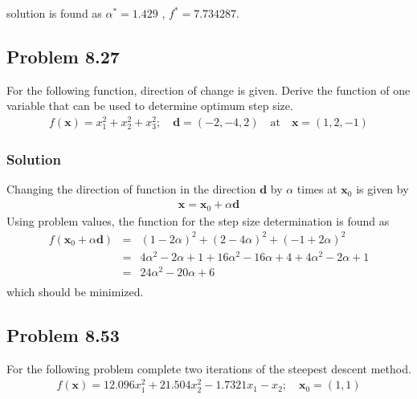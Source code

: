 \documentclass[]{report}
\begin{document}
solution is found as $\alpha^*=1.429$ , $  f^*=7.734287$.
\subsection*{Problem 8.27}
For the following function, direction of change is given. Derive the function of one variable that can be used to determine optimum step size.
\begin{eqnarray*}
f\left(\mathbf x\right)=x_1^2+x_2^2+x_3^2 ; \quad \mathbf d=\left(-2,-4,2\right)\quad \mathrm{at} \quad \mathbf{x}=\left(1,2,-1\right)
\end{eqnarray*}
\subsubsection*{Solution}
Changing the direction of function in the direction $\mathbf d$ by $\alpha$ times at $\mathbf{x}_0$ is given by
\begin{eqnarray*}
\mathbf x=\mathbf{x}_0+\alpha \mathbf d
\end{eqnarray*}
Using problem values, the function for the step size determination is found as
\begin{eqnarray*}
f\left( \mathbf{x}_0+\alpha \mathbf d\right)&=&\left(1-2\alpha\right)^2+\left(2-4\alpha\right)^2+\left(-1+2\alpha\right)^2\\
&=& 4\alpha^2-2\alpha+1+16\alpha^2-16\alpha+4+4\alpha^2-2\alpha+1\\
&=& 24\alpha^2-20\alpha+6\\
\end{eqnarray*}
which should be minimized.
\newpage
\subsection*{Problem 8.53}
\label{Problem1053}
For the following problem complete two iterations of the steepest descent method.
\begin{eqnarray*}
f\left(\mathbf{x}\right)=12.096x_1^2+21.504x_2^2-1.7321x_1-x_2 ; \quad \mathbf x_0 =\left(1,1\right)
\end{eqnarray*}
\end{document}
